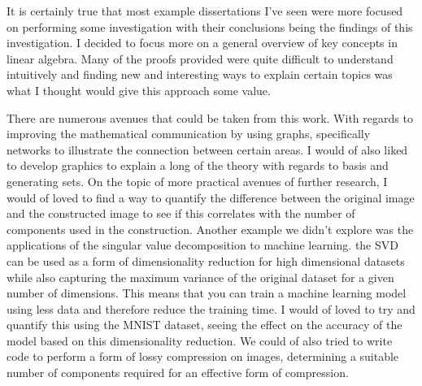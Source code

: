 \documentclass[a4paper,12pt]{article}
\begin{document}
	It is certainly true that most example dissertations I've seen were more focused on performing some investigation with their conclusions being the findings of this investigation. I decided to focus more on a general overview of key concepts in linear algebra. Many of the proofs provided were quite difficult to understand intuitively and finding new and interesting ways to explain certain topics was what I thought would give this approach some value. 
	
	There are numerous avenues that could be taken from this work. With regards to improving the mathematical communication by using graphs, specifically networks to illustrate the connection between certain areas. I would of also liked to develop graphics to explain a long of the theory with regards to basis and generating sets. On the topic of more practical avenues of further research, I would of loved to find a way to quantify the difference between the original image and the constructed image to see if this correlates with the number of components used in the construction. Another example we didn't explore was the applications of the singular value decomposition to machine learning. the SVD can be used as a form of dimensionality reduction for high dimensional datasets while also capturing the maximum variance of the original dataset for a given number of dimensions. This means that you can train a machine learning model using less data and therefore reduce the training time. I would of loved to try and quantify this using the MNIST dataset, seeing the effect on the accuracy of the model based on this dimensionality reduction. We could of also tried to write code to perform a form of lossy compression on images, determining a suitable number of components required for an effective form of compression. 
	\printbibliography
\end{document}
